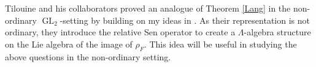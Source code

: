 \documentclass[11pt]{amsart}
\theoremstyle{definition}
\theoremstyle{remark}
\DeclareMathOperator{\GL}{GL}
\begin{document}
Tilouine and his collaborators proved an analogue of Theorem \ref{Lang} in the non-ordinary $\GL_2$-setting \cite{CIT15} by building on my ideas in \cite{Lang15}.  As their representation is not ordinary, they introduce the relative Sen operator to create a $\Lambda$-algebra structure on the Lie algebra of the image of $\rho_F$.  This idea will be useful in studying the above questions in the non-ordinary setting. 

{}

\end{document}
